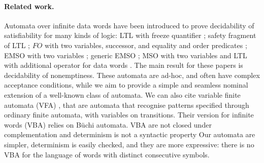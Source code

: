 \paragraph{Related work.}	
Automata over infinite data words have been introduced to prove decidability of satisfiability for many kinds of logic: LTL with freeze quantifier \cite{DemriL09}; safety fragment of LTL \cite{Lazic11}; $FO$ with two variables, successor, and equality and order predicates \cite{BojanczykDMSS11}; EMSO with two variables \cite{KaraST12}; generic EMSO \cite{Bollig11}; MSO with two variables and LTL with additional operator for data words \cite{KaraT10}. The main result for these papers is decidability of nonemptiness. These automata are ad-hoc, and often have complex acceptance conditions, while we aim to provide a simple and seamless nominal extension of a well-known class of automata. We can also cite variable finite automata (VFA) \cite{GrumbergKS10}, that are automata that recognise patterns specified through ordinary finite automata, with variables on transitions. Their version for infinite words (VBA) relies on B\"uchi automata. VBA are not closed under complementation and determinism is not a syntactic property
Our automata are simpler, determinism is easily checked, and they are more expressive: there is no VBA for the language of words with distinct consecutive symbols.

